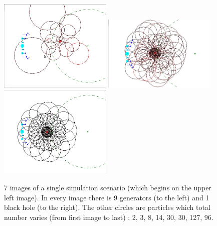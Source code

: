 \documentclass[a4paper]{article} %
\begin{document}
\begin{multicols*}{2}
\begin{figure}[H]
\end{figure}
\begin{figure}[H]
\centering
\includegraphics[width=0.48\textwidth]{5.jpg}
\includegraphics[width=0.48\textwidth]{6.jpg}
\includegraphics[width=0.48\textwidth]{7.jpg}

\caption{7 images of a single simulation scenario (which begins on the upper left image). In every image there is 9 generators (to the left) and 1 black hole (to the right).
The other circles are particles which total number varies (from first image to last) : 2, 3, 8, 14, 30, 30, 127, 96.}
\end{figure}
\label{lastpage}
\end{multicols*}
\end{document}
